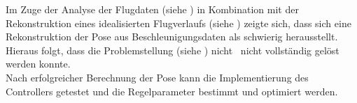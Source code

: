 
Im Zuge der Analyse der Flugdaten (siehe ) in Kombination mit der Rekonstruktion eines idealisierten Flugverlaufs (siehe ) zeigte sich, dass sich eine Rekonstruktion der Pose aus Beschleunigungsdaten als schwierig herausstellt.\\
Hieraus folgt, dass die Problemstellung (siehe ) nicht \bzw\ nicht vollständig gelöst werden konnte.\\

Nach erfolgreicher Berechnung der Pose kann die Implementierung des Controllers getestet und die Regelparameter bestimmt und optimiert werden.








